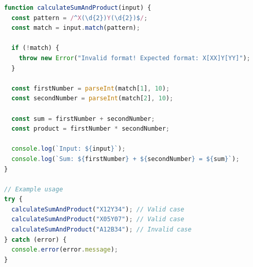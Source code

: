 \begin{lstlisting}[language=JavaScript, caption={$\texttt{Sample}$ procedure.}, label={lst:1}]
function calculateSumAndProduct(input) {
  const pattern = /^X(\d{2})Y(\d{2})$/;
  const match = input.match(pattern);

  if (!match) {
    throw new Error("Invalid format! Expected format: X[XX]Y[YY]");
  }

  const firstNumber = parseInt(match[1], 10);
  const secondNumber = parseInt(match[2], 10);

  const sum = firstNumber + secondNumber;
  const product = firstNumber * secondNumber;

  console.log(`Input: ${input}`);
  console.log(`Sum: ${firstNumber} + ${secondNumber} = ${sum}`);
}

// Example usage
try {
  calculateSumAndProduct("X12Y34"); // Valid case
  calculateSumAndProduct("X05Y07"); // Valid case
  calculateSumAndProduct("A12B34"); // Invalid case
} catch (error) {
  console.error(error.message);
}
\end{lstlisting}